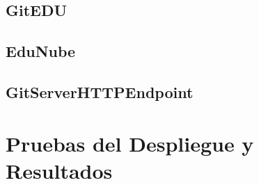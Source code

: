 \subsection{GitEDU}

\subsection{EduNube}

\subsection{GitServerHTTPEndpoint}

\section{Pruebas del Despliegue y Resultados}

